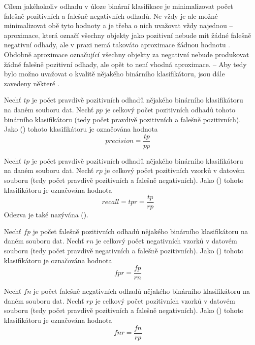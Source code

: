 Cílem jakéhokoliv odhadu v úloze binární klasifikace je minimalizovat počet falešně pozitivních a falešně negativních odhadů. Ne vždy je ale možné minimalizovat obě tyto hodnoty a je třeba o nich uvažovat vždy najednou -- aproximace, která označí všechny objekty jako pozitivní nebude mít žádné falešně negativní odhady, ale v praxi nemá takováto aproximace žádnou hodnotu . Obdobně aproximace označující všechny objekty za negativní nebude produkovat žádné falešně pozitivní odhady, ale opět to není vhodná aproximace. -- Aby tedy bylo možno uvažovat o kvalitě nějakého binárního klasifikátoru, jsou dále zavedeny některé  .

\begin{define}
	Nechť \( tp \) je počet pravdivě pozitivních odhadů nějakého binárního klasifikátoru na daném souboru dat. Nechť \( pp \) je celkový počet pozitivních odhadů tohoto binárního klasifikátoru (tedy počet pravdivě pozitivních a falešně pozitivních). Jako  () tohoto klasifikátoru je označována hodnota
	\[ precision = \frac{tp}{pp} \]
\end{define}

\begin{define}
	Nechť \( tp \) je počet pravdivě pozitivních odhadů nějakého binárního klasifikátoru na daném souboru dat. Nechť \( rp \) je celkový počet pozitivních vzorků v datovém souboru (tedy počet pravdivě pozitivních a falešně negativních). Jako  () tohoto klasifikátoru je označována hodnota
	\[ recall = tpr = \frac{tp}{rp} \]
	Odezva je také nazývána  ().
\end{define}

\begin{define}
	Nechť \( fp \) je počet falešně pozitivních odhadů nějakého binárního klasifikátoru na daném souboru dat. Nechť \( rn \) je celkový počet negativních vzorků v datovém souboru (tedy počet pravdivě negativních a falešně pozitivních). Jako  () tohoto klasifikátoru je označována hodnota
	\[ fpr = \frac{fp}{rn} \]
\end{define}

\begin{define}
	Nechť \( fn \) je počet falešně negativních odhadů nějakého binárního klasifikátoru na daném souboru dat. Nechť \( rp \) je celkový počet pozitivních vzorků v datovém souboru (tedy počet pravdivě pozitivních a falešně negativních). Jako  () tohoto klasifikátoru je označována hodnota
	\[ fnr = \frac{fn}{rp} \]
\end{define}

